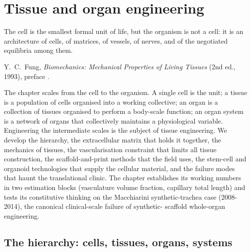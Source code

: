 \chapter{Tissue and organ engineering}
\label{vol06:ch05}

\epigraph{The cell is the smallest formal unit of life, but the
organism is not a cell: it is an architecture of cells, of matrices,
of vessels, of nerves, and of the negotiated equilibria among them.}{Y.\ C.\
Fung, \emph{Biomechanics: Mechanical Properties of Living Tissues}
(2nd ed., 1993), preface \cite[p.~ix]{text:fung-biomechanics}.}


\noindent
The chapter scales from the cell to the organism. A single cell is
the unit; a tissue is a population of cells organised into a working
collective; an organ is a collection of tissues organised to perform
a body-scale function; an organ system is a network of organs that
collectively maintains a physiological variable. Engineering the
intermediate scales is the subject of tissue engineering. We develop
the hierarchy, the extracellular matrix that holds it together, the
mechanics of tissues, the vascularisation constraint that limits all
tissue construction, the scaffold-and-print methods that the field
uses, the stem-cell and organoid technologies that supply the
cellular material, and the failure modes that haunt the translational
clinic. The chapter establishes its working numbers in two estimation
blocks (vasculature volume fraction, capillary total length) and
tests its constitutive thinking on the Macchiarini synthetic-trachea
case (2008-2014), the canonical clinical-scale failure of synthetic-
scaffold whole-organ engineering.

\section{The hierarchy: cells, tissues, organs, systems}

